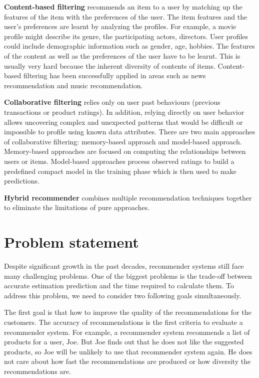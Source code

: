 \documentclass[oneside,13pt]{extreport}
\begin{document}
\begin{description}
    \item{\textbf{Content-based filtering}} recommends an item to a user by matching up the features of the item with the preferences of the user. The item features and the user's preferences are learnt by analyzing the profiles. For example, a movie profile might describe its genre, the participating actors, directors. User profiles could include demographic information such as gender, age, hobbies. The features of the content as well as the preferences of the user have to be learnt. This is usually very hard because the inherent diversity of contents of items. Content-based filtering has been successfully applied in areas such as news recommendation and music recommendation.
    \item{\textbf{Collaborative filtering}} relies only on user past behaviours (previous transactions or product ratings). In addition, relying directly on user behavior allows uncovering complex and unexpected patterns that would be difficult or impossible to profile using known data attributes\cite{koren2008factorization}. There are two main approaches of collaborative filtering: memory-based approach and model-based approach. Memory-based approaches are focused on computing the relationships between users or items. Model-based approaches process observed ratings to build a predefined compact model in the training phase which is then used to make predictions.
    \item{\textbf{Hybrid recommender}} combines multiple recommendation techniques together to eliminate the limitations of pure approaches\cite{tran2000hybrid}.
\end{description}


\section{Problem statement}
Despite significant growth in the past decades, recommender systems still face many challenging problems. One of the biggest problems is the trade-off between accurate estimation prediction and the time required to calculate them.  To address this problem, we need to consider two following goals simultaneously.

The first goal is that how to improve the quality of the recommendations for the customers. The accuracy of recommendations is the first criteria to evaluate a recommender system. For example, a recommender system recommends a list of products for a user, Joe. But Joe finds out that he does not like the suggested products, so Joe will be unlikely to use that recommender system again. He does not care about how fast the recommendations are produced or how diversity the recommendations are.
\end{document}
